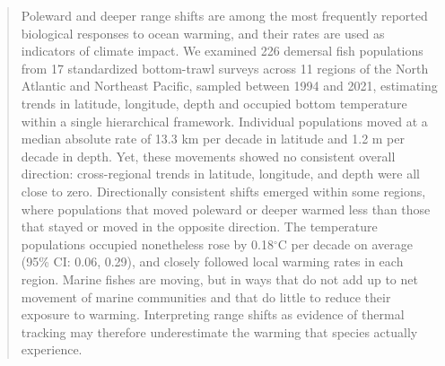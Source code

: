 \documentclass[9pt,twocolumn,twoside]{pnas-new}
\begin{document}

\begin{abstract}
Poleward and deeper range shifts are among the most frequently reported biological responses to ocean warming, and their rates are used as indicators of climate impact. We examined 226 demersal fish populations from 17 standardized bottom-trawl surveys across 11 regions of the North Atlantic and Northeast Pacific, sampled between 1994 and 2021, estimating trends in latitude, longitude, depth and occupied bottom temperature within a single hierarchical framework. Individual populations moved at a median absolute rate of 13.3 km per decade in latitude and 1.2 m per decade in depth. Yet, these movements showed no consistent overall direction: cross-regional trends in latitude, longitude, and depth were all close to zero. Directionally consistent shifts emerged within some regions, where populations that moved poleward or deeper warmed less than those that stayed or moved in the opposite direction. The temperature populations occupied nonetheless rose by 0.18$^\circ$C per decade on average (95\% CI:
0.06, 0.29), and closely followed local warming rates in each region. Marine fishes are moving, but in ways that do not add up to net movement of marine communities and that do little to reduce their exposure to warming. Interpreting range shifts as evidence of thermal tracking may therefore underestimate the warming that species actually experience.
\end{abstract}



\maketitle
\thispagestyle{firststyle}

\Firstpage

\end{document}
